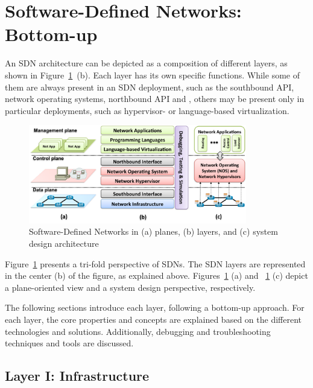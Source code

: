 \section{Software-Defined Networks: Bottom-up}
\label{sec:layeredapproach}

An SDN architecture can be depicted as a composition of different layers, 
as shown in Figure~\ref{fig:sdnlayers}~(b). Each layer has its own specific functions.
While some of them are always present in an SDN deployment, such as the southbound API, 
network operating systems, northbound API and \manapps, others may be 
present only in particular deployments, such as hypervisor- or language-based virtualization.

\begin{figure}[ht!]
\centering
\includegraphics[width=0.85\textwidth]{figures/fig5_sdn_in_layers.pdf}
\caption{Software-Defined Networks in (a) planes, (b) layers, and (c) system design architecture}
\label{fig:sdnlayers}
\end{figure}

Figure~\ref{fig:sdnlayers} presents a tri-fold perspective of SDNs. The SDN layers are represented 
in the center (b) of the figure, as explained above. Figures~\ref{fig:sdnlayers} (a) and ~\ref{fig:sdnlayers} (c) depict
a plane-oriented view and a system design perspective, respectively.

The following sections introduce each layer, following a bottom-up approach. For each layer, the core properties and concepts are explained based on the different technologies and solutions.  Additionally, debugging and troubleshooting techniques and tools are discussed.

\subsection{Layer I: Infrastructure}
\label{sec:infrastructure}


